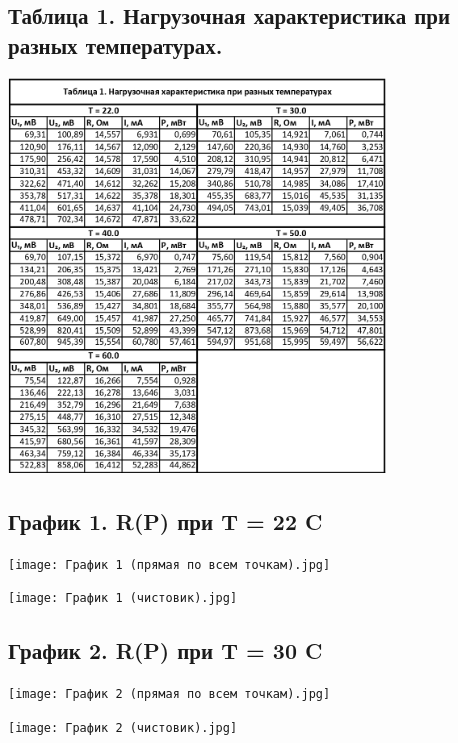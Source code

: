 \documentclass[15pt,a5paper,reqno]{article}
\begin{document}
    \subsection{Таблица 1. Нагрузочная характеристика при разных температурах.}
    
    \begin{center}
        \includegraphics[width=10cm]{Таблица 1.jpg}
    \end{center}
    
    \newpage
    \subsection{График 1. R(P) при T = 22 \degree C}
    
    \begin{center}
        \centering
        \texttt{[image: График 1 (прямая по всем точкам).jpg]}
    \end{center}
    \begin{center}
        \centering
        \texttt{[image: График 1 (чистовик).jpg]}
    \end{center}
    
    \newpage
    \subsection{График 2. R(P) при T = 30 \degree C}
    
    \begin{center}
        \centering
        \texttt{[image: График 2 (прямая по всем точкам).jpg]}
    \end{center}
    \begin{center}
        \centering
        \texttt{[image: График 2 (чистовик).jpg]}
    \end{center}
    
\end{document}
